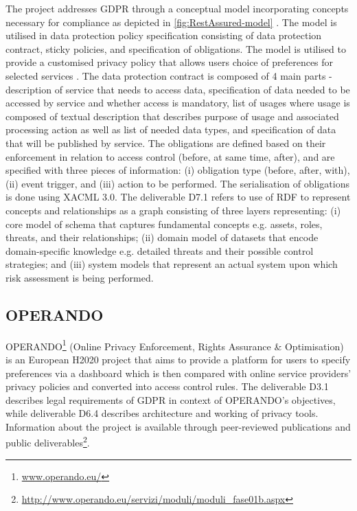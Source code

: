 The project addresses GDPR through a conceptual model incorporating concepts necessary for compliance as depicted in \autoref{fig:RestAssured-model} \cite{RestAssured_D6.1}. The model is utilised in data protection policy specification consisting of data protection contract, sticky policies, and specification of obligations. The model is utilised to provide a customised privacy policy that allows users choice of preferences for selected services \cite{gritzalis_privacy_2019}. The data protection contract is composed of 4 main parts - description of service that needs to access data, specification of data needed to be accessed by service and whether access is mandatory, list of usages where usage is composed of textual description that describes purpose of usage and associated processing action as well as list of needed data types, and specification of data that will be published by service.
The obligations are defined based on their enforcement in relation to access control (before, at same time, after), and are specified with three pieces of information: (i) obligation type (before, after, with), (ii) event trigger, and (iii) action to be performed. The serialisation of obligations is done using XACML 3.0.
The deliverable D7.1 \cite{noauthor_d7.1_2018} refers to use of RDF to represent concepts and relationships as a graph consisting of three layers representing: (i) core model of schema that captures fundamental concepts e.g. assets, roles, threats, and their relationships; (ii) domain model of datasets that encode domain-specific knowledge e.g. detailed threats and their possible control strategies; and (iii) system models that represent an actual system upon which risk assessment is being performed.

\subsection*{OPERANDO}
OPERANDO\footnote{\url{www.operando.eu/}} (Online Privacy Enforcement, Rights Assurance \& Optimisation) is an European H2020 project that aims to provide a platform for users to specify preferences via a dashboard which is then compared with online service providers' privacy policies and converted into access control rules.
The deliverable D3.1 \cite{noauthor_d3.1_2016} describes legal requirements of GDPR in context of OPERANDO's objectives, while deliverable D6.4 \cite{noauthor_d6.4_2017} describes architecture and working of privacy tools.
Information about the project is available through peer-reviewed publications and public deliverables\footnote{\url{http://www.operando.eu/servizi/moduli/moduli_fase01b.aspx}}.

